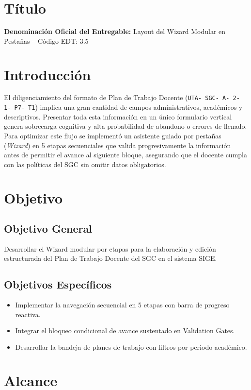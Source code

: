 \documentclass[12pt,a4paper]{article}
\begin{document}
\section{Título}
\textbf{Denominación Oficial del Entregable:} Layout del Wizard Modular en Pestañas -- Código EDT: 3.5

\section{Introducción}
El diligenciamiento del formato de Plan de Trabajo Docente (\texttt{UTA- SGC- A- 2- 1- P7- T1}) implica una gran cantidad de campos administrativos, académicos y descriptivos. Presentar toda esta información en un único formulario vertical genera sobrecarga cognitiva y alta probabilidad de abandono o errores de llenado. Para optimizar este flujo se implementó un asistente guiado por pestañas (\textit{Wizard}) en 5 etapas secuenciales que valida progresivamente la información antes de permitir el avance al siguiente bloque, asegurando que el docente cumpla con las políticas del SGC sin omitir datos obligatorios.

\section{Objetivo}
\subsection{Objetivo General}
Desarrollar el Wizard modular por etapas para la elaboración y edición estructurada del Plan de Trabajo Docente del SGC en el sistema SIGE.
\subsection{Objetivos Específicos}
\begin{itemize}[leftmargin=1.5em, itemsep=2pt]
    \item Implementar la navegación secuencial en 5 etapas con barra de progreso reactiva.
    \item Integrar el bloqueo condicional de avance sustentado en Validation Gates.
    \item Desarrollar la bandeja de planes de trabajo con filtros por periodo académico.
\end{itemize}

\section{Alcance}
\end{document}
